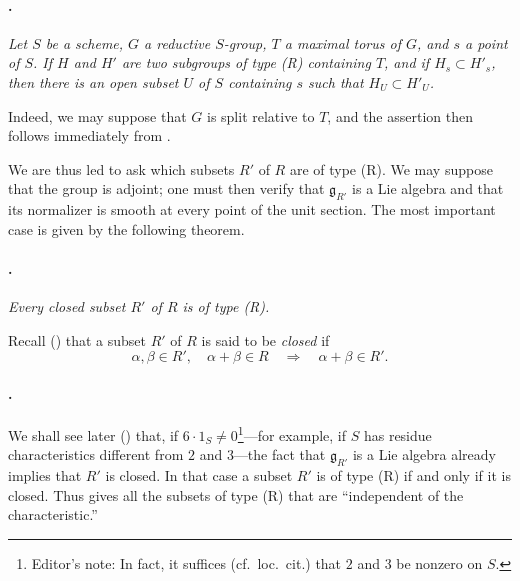 \paragraph{.}
\textit{Let \(S\) be a scheme, \(G\) a reductive \(S\)-group, \(T\)
a maximal torus of \(G\), and \(s\) a point of \(S\). If \(H\) and
\(H'\) are two subgroups of type \textup{(R)} containing \(T\), and
if \(H_s\subset H'_s\), then there is an open subset \(U\) of \(S\)
containing \(s\) such that \(H_U\subset H'_U\).}

Indeed, we may suppose that \(G\) is split relative to \(T\), and
the assertion then follows immediately from  \textup{}.

We are thus led to ask which subsets \(R'\) of \(R\) are of type
\textup{(R)}. We may suppose that the group is adjoint; one must
then verify that \(\mathfrak g_{R'}\) is a Lie algebra and that its
normalizer is smooth at every point of the unit section. The most
important case is given by the following theorem.

\paragraph{.}
\textit{Every closed subset \(R'\) of \(R\) is of type
\textup{(R)}.}

Recall \textup{()} that a subset \(R'\) of \(R\)
is said to be \emph{closed} if
\[
  \alpha,\beta\in R',\quad \alpha+\beta\in R
  \quad\Longrightarrow\quad
  \alpha+\beta\in R'.
\]

\paragraph{.}
We shall see later \textup{()} that, if
\(6\cdot1_S\ne0\)\footnote{Editor's note: In fact, it suffices
\textup{(cf.\ loc.\ cit.)} that \(2\) and \(3\) be nonzero on
\(S\).}---for example, if \(S\) has residue characteristics
different from \(2\) and \(3\)---the fact that
\(\mathfrak g_{R'}\) is a Lie algebra already implies that \(R'\)
is closed. In that case a subset \(R'\) is of type \textup{(R)} if
and only if it is closed. Thus  gives all the subsets
of type \textup{(R)} that are ``independent of the
characteristic.''

